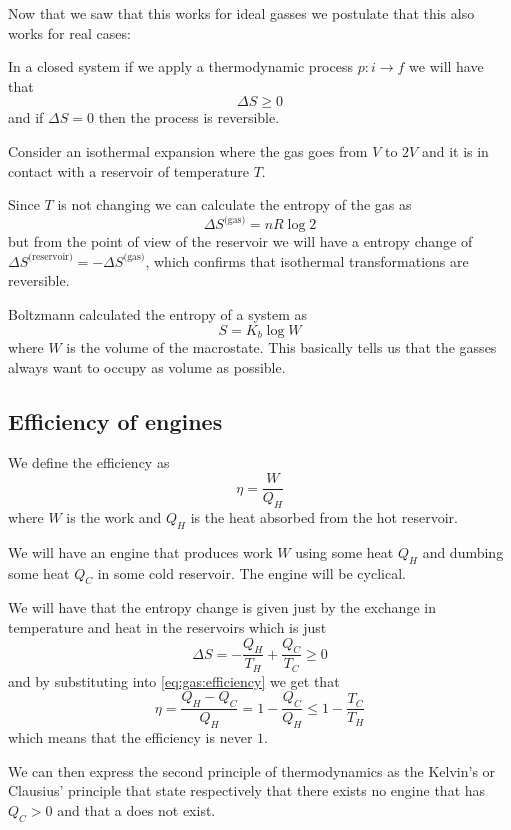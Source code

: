 \documentclass[12pt]{extarticle}
\begin{document}
Now that we saw that this works for ideal gasses we postulate that this also works for real cases:

\begin{theorem}
    \label{thm:gas:second_principle}
    In a closed system if we apply a thermodynamic process $p: i \to f$ we will have that
    \begin{equation}
        \Delta S \geq 0
    \end{equation}
    and if $\Delta S = 0$ then the process is reversible.
\end{theorem}

\begin{example}
    Consider an isothermal expansion where the gas goes from $V$ to $2V$ and it is in contact with a reservoir of temperature $T$.

    Since $T$ is not changing we can calculate the entropy of the gas as
    \begin{equation}
        \Delta S^{\text{(gas)}} = n R \log 2
    \end{equation}
    but from the point of view of the reservoir we will have a entropy change of $\Delta S^{\text{(reservoir)}} = - \Delta S^{\text{(gas)}}$, which confirms that isothermal transformations are reversible.
\end{example}

Boltzmann calculated the entropy of a system as
\begin{equation}
    S = K_b \log W
\end{equation}
where $W$ is the volume of the macrostate.
This basically tells us that the gasses always want to occupy as volume as possible.

\subsection{Efficiency of engines}

We define the efficiency as
\begin{equation}
    \label{eq:gas:efficiency}
    \eta = \frac{W}{Q_H}
\end{equation}
where $W$ is the work and $Q_H$ is the heat absorbed from the hot reservoir.

We will have an engine that produces work $W$ using some heat $Q_H$ and dumbing some heat $Q_C$ in some cold reservoir.
The engine will be cyclical.

We will have that the entropy change is given just by the exchange in temperature and heat in the reservoirs which is just
\begin{equation}
    \Delta S = - \frac{Q_H}{T_H} + \frac{Q_C}{T_C} \geq 0
\end{equation}
and by substituting into \autoref{eq:gas:efficiency} we get that
\begin{equation}
    \eta = \frac{Q_H - Q_C}{Q_H} = 1 - \frac{Q_C}{Q_H} \leq 1 - \frac{T_C}{T_H}
\end{equation}
which means that the efficiency is never $1$.

We can then express the second principle of thermodynamics as the Kelvin's or Clausius' principle that state respectively that there exists no engine that has $Q_C > 0$ and that a  does not exist.
\end{document}
